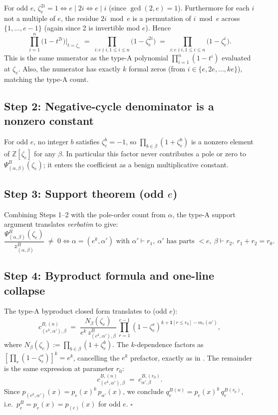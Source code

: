 \documentclass[11pt]{article}
\theoremstyle{remark}
\newcommand{\qeB}{q_e^B}
\newcommand{\peB}{p_e^B}
\newcommand{\zetae}{\zeta_e}
\newcommand{\ZZ}{\mathbb{Z}}
\newcommand{\one}{\mathbf{1}}
\begin{document}
For odd $e$, $\zetae^{2i} = 1 \iff e \mid 2i \iff e \mid i$ (since $\gcd(2, e) = 1$). Furthermore for each $i$ not a multiple of $e$, the residue $2i \bmod e$ is a permutation of $i \bmod e$ across $\{1, \ldots, e-1\}$ (again since 2 is invertible mod $e$). Hence
\[
  \prod_{i=1}^n\bigl(1 - t^{2i}\bigr)\Big|_{t = \zetae}
  \;=\; \prod_{i: e \nmid i, 1 \le i \le n}\bigl(1 - \zetae^{2i}\bigr)
  \;=\; \prod_{i: e \nmid i, 1 \le i \le n}\bigl(1 - \zetae^{i}\bigr).
\]
This is the same numerator as the type-A polynomial $\prod_{i=1}^n(1-t^i)$ evaluated at $\zetae$. Also, the numerator has exactly $k$ formal zeros (from $i \in \{e, 2e, \ldots, ke\}$), matching the type-A count.

\subsection*{Step 2: Negative-cycle denominator is a nonzero constant}

For odd $e$, no integer $b$ satisfies $\zetae^b = -1$, so $\prod_{b \in \beta}(1 + \zetae^b)$ is a nonzero element of $\ZZ[\zetae]$ for any $\beta$. In particular this factor never contributes a pole or zero to $\Psi^B_{(\alpha,\beta)}(\zetae)$; it enters the coefficient as a benign multiplicative constant.

\subsection*{Step 3: Support theorem (odd $e$)}

Combining Steps 1--2 with the pole-order count from $\alpha$, the type-A support argument \cite{Cli26-support} translates \emph{verbatim} to give:
\[
  \frac{\Psi^B_{(\alpha,\beta)}(\zetae)}{z^B_{(\alpha,\beta)}} \;\ne\; 0
  \iff \alpha = (e^k, \alpha') \text{ with } \alpha' \vdash r_1,\ \alpha' \text{ has parts } < e,\ \beta \vdash r_2,\ r_1 + r_2 = r_0.
\]

\subsection*{Step 4: Byproduct formula and one-line collapse}

The type-A byproduct closed form \cite[eq.\ (\ref{eq:cnu-closed})]{Cli26-selfsim} translates to (odd $e$):
\begin{equation}\label{eq:byproduct-B}
  c^{B, (n)}_{(e^k, \alpha'), \beta} \;=\; \frac{N_\beta(\zetae)}{e^k\, z^B_{(e^k, \alpha'), \beta}}\, \prod_{r=1}^{e-1}(1 - \zetae^r)^{k + \one[r \le r_0] - m_r(\alpha')},
\end{equation}
where $N_\beta(\zetae) := \prod_{b \in \beta}(1 + \zetae^b)$. The $k$-dependence factors as $[\prod_r(1-\zetae^r)]^k = e^k$, cancelling the $e^k$ prefactor, exactly as in \cite{Cli26-selfsim}. The remainder is the same expression at parameter $r_0$:
\[
  c^{B, (n)}_{(e^k, \alpha'), \beta} \;=\; c^{B, (r_0)}_{\alpha', \beta}.
\]
Since $p_{(e^k, \alpha')}(x) = p_e(x)^k\, p_{\alpha'}(x)$, we conclude $\qeB^{(n)} = p_e(x)^k\, \qeB^{(r_0)}$, i.e.\ $\peB = p_e(x) = p_{(e)}(x)$ for odd $e$. \hfill$\square$
\end{document}

